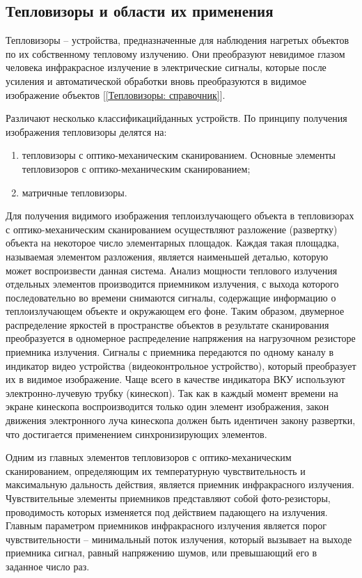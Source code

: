 \documentclass[14pt, a4paper]{extreport}
\begin{document}
	\subsection{Тепловизоры и области их применения}
	Тепловизоры -- устройства, предназначенные для наблюдения нагретых объектов по их собственному тепловому излучению. Они преобразуют невидимое глазом человека инфракрасное излучение в электрические сигналы, которые после усиления и автоматической обработки вновь преобразуются в видимое изображение объектов [\ref{Тепловизоры: справочник}].
	
	Различают несколько классификацийданных устройств. По принципу получения изображения тепловизоры делятся на:
	\begin{enumerate}[label={\arabic*)}]
		\item тепловизоры с оптико-механическим сканированием. Основные элементы тепловизоров с оптико-механическим сканированием;
		\item матричные тепловизоры.
	\end{enumerate}	
	
	Для получения видимого изображения теплоизлучающего объекта в тепловизорах с оптико-механическим сканированием осуществляют разложение (развертку) объекта на некоторое число элементарных площадок. Каждая такая площадка, называемая элементом разложения, является наименьшей деталью, которую может воспроизвести данная система. Анализ мощности теплового излучения отдельных элементов производится приемником излучения, с выхода которого последовательно во времени снимаются сигналы, содержащие информацию о теплоизлучающем объекте и окружающем его фоне. Таким образом, двумерное распределение яркостей в пространстве объектов в результате сканирования преобразуется в одномерное распределение напряжения на нагрузочном резисторе приемника излучения. Сигналы с приемника передаются по одному каналу в индикатор видео устройства (видеоконтрольное устройство), который преобразует их в видимое изображение. Чаще всего в качестве индикатора ВКУ используют электронно-лучевую трубку (кинескоп). Так как в каждый момент времени на экране кинескопа воспроизводится только один элемент изображения, закон движения электронного луча кинескопа должен быть идентичен закону развертки, что достигается применением синхронизирующих элементов.
	
	Одним из главных элементов тепловизоров с оптико-механическим сканированием, определяющим их температурную чувствительность и максимальную дальность действия, является приемник инфракрасного излучения. Чувствительные элементы приемников представляют собой фото-резисторы, проводимость которых изменяется под действием падающего на излучения. Главным параметром приемников инфракрасного излучения является порог чувствительности -- минимальный поток излучения, который вызывает на выходе приемника сигнал, равный напряжению шумов, или превышающий его в заданное число раз.
	
\end{document}
